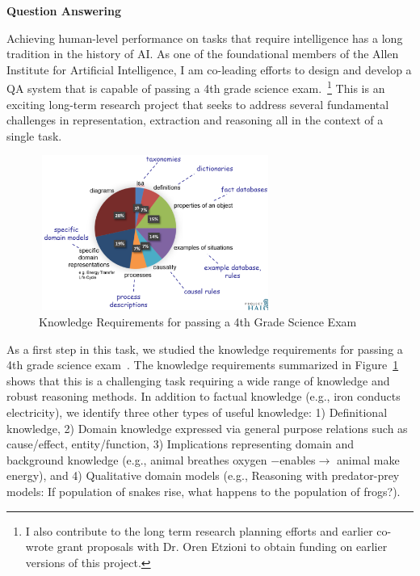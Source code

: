 \documentclass[a4paper,11pt,onecolumn]{article}
\begin{document}
{\bf Question Answering}

Achieving human-level performance on tasks that require intelligence has a long tradition in the history of AI. As one of the foundational members of the Allen Institute for Artificial Intelligence, I am co-leading efforts to design and develop a QA system that is capable of passing a 4th grade science exam.~\footnote{I also contribute to the long term research planning efforts and earlier co-wrote grant proposals with Dr. Oren Etzioni to obtain funding on earlier versions of this project.} This is an exciting long-term research project that seeks to address several fundamental challenges in representation, extraction and reasoning all in the context of a single task. 
\begin{figure}
	\begin{center}
	\includegraphics[width=3in,height=2in]{figures/akbc} 	
	\vspace{-2ex}
	\caption{\label{fig:akbc} {\small Knowledge Requirements for passing a 4th Grade Science Exam}}
	\vspace{-2ex}
	\end{center}
\end{figure}

As a first step in this task, we studied the knowledge requirements for passing a 4th grade science exam~\cite{clark-akbc13}. The knowledge requirements summarized in Figure~\ref{fig:akbc} shows that this is a challenging task requiring a wide range of knowledge and robust reasoning methods. In addition to factual knowledge (e.g., iron conducts electricity), we identify three other types of useful knowledge: 1) Definitional knowledge, 2) Domain knowledge expressed via general purpose relations such as cause/effect, entity/function, 3) Implications representing domain and background knowledge (e.g., animal breathes oxygen $-$enables$\rightarrow$ animal make energy), and 4) Qualitative domain models (e.g., Reasoning with predator-prey models: If population of snakes rise, what happens to the population of frogs?).
\end{document}
